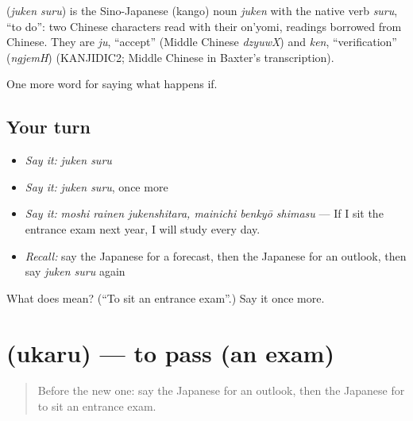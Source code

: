 \begin{cousinweb}
\textbf{} (\emph{juken suru}) is the Sino-Japanese (kango) noun \emph{juken} with the native verb \emph{suru}, \textquotedblleft{}to do\textquotedblright{}: two Chinese characters read with their on'yomi, readings borrowed from Chinese. They are \emph{ju}, \textquotedblleft{}accept\textquotedblright{} (Middle Chinese \emph{dzyuwX}) and \emph{ken}, \textquotedblleft{}verification\textquotedblright{} (\emph{ngjemH}) (KANJIDIC2; Middle Chinese in Baxter's transcription).
\end{cousinweb}

\begin{grammarlens}[title={What you've built}]
One more word for saying what happens if.
\end{grammarlens}

\subsection*{Your turn}
\begin{itemize}
\raggedright
  \item \emph{Say it:} \emph{juken suru}
  \item \emph{Say it:} \emph{juken suru}, once more
  \item \emph{Say it:} \emph{moshi rainen jukenshitara, mainichi benkyō shimasu} — If I sit the entrance exam next year, I will study every day.
  \item \emph{Recall:} say the Japanese for a forecast, then the Japanese for an outlook, then say \emph{juken suru} again
\end{itemize}

\begin{tcolorbox}[breakable,colback=teal!4,colframe=teal!35!black,title={Before you move on}]
What does  mean? (\textquotedblleft{}To sit an entrance exam\textquotedblright{}.) Say it once more.
\end{tcolorbox}
\section[\texorpdfstring{\ja{うかる} (ukaru)}{うかる (ukaru)}]{ (ukaru) — to pass (an exam)}

\label{lesson:JA-C515-ukaru}



\begin{quote}
Before the new one: say the Japanese for an outlook, then the Japanese for to sit an entrance exam.
\end{quote}

